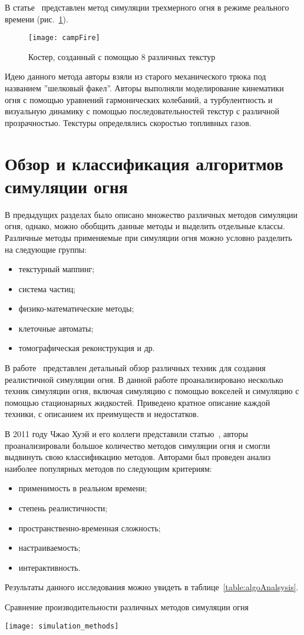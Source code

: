 В статье~\cite{SpringMass} представлен метод симуляции трехмерного огня в режиме
реального времени (рис.~\ref{fig:campFire}).
\begin{figure}[htb]
	\centering
    \texttt{[image: campFire]}
    \caption{Костер, созданный с помощью 8 различных текстур}%
    \label{fig:campFire}
\end{figure}
Идею данного метода авторы взяли из старого механического трюка под названием
''шелковый факел''. Авторы выполняли моделирование кинематики огня с помощью
уравнений гармонических колебаний, а турбулентность и визуальную динамику с
помощью последовательностей текстур с различной прозрачностью. Текстуры
определялись скоростью топливных газов.

\section{Обзор и классификация алгоритмов симуляции огня}

В предыдущих разделах было описано множество различных методов симуляции огня,
однако, можно обобщить данные методы и выделить отдельные классы. Различные
методы применяемые при симуляции огня можно условно разделить на следующие
группы:
\begin{itemize}
	\item текстурный маппинг;
	\item система частиц;
	\item физико-математические методы;
	\item клеточные автоматы;
	\item томографическая реконструкция и др.
\end{itemize}

В работе~\cite{realistic_sim} представлен детальный обзор различных техник для
создания реалистичной симуляции огня. В данной работе проанализировано несколько
техник симуляции огня, включая симуляцию с помощью вокселей и симуляцию с
помощью стационарных жидкостей. Приведено кратное описание каждой техники, с
описанием их преимуществ и недостатков.

В 2011 году Чжао Хуэй и его коллеги представили статью~\cite{survey}, авторы
проанализировали большое количество методов симуляции огня и смогли выдвинуть
свою классификацию методов. Авторами был проведен анализ наиболее популярных
методов по следующим критериям:
\begin{itemize}
	\item применимость в реальном времени;
	\item степень реалистичности;
	\item пространственно-временная сложность;
	\item настраиваемость;
	\item интерактивность.
\end{itemize}
Результаты данного исследования можно увидеть в таблице~\ref{table:algoAnalsysis}.
\begin{table}[htb]
    \caption{Сравнение производительности различных методов симуляции огня}
    \texttt{[image: simulation\_methods]}%
    \label{table:algoAnalsysis}
\end{table}

